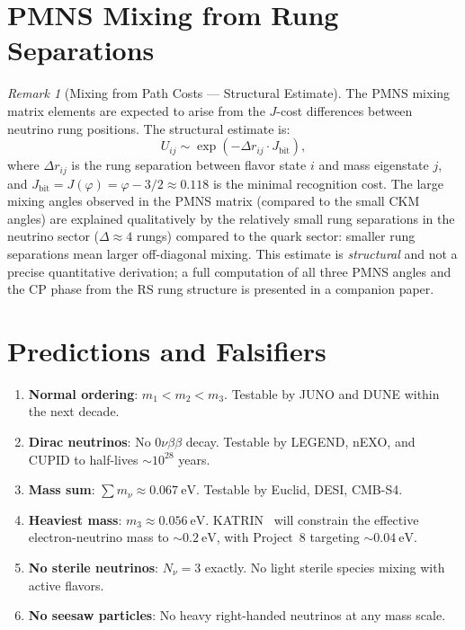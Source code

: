 \documentclass[12pt,a4paper]{article}
\theoremstyle{definition}
\theoremstyle{remark}
\newtheorem{remark}[theorem]{Remark}
\begin{document}
\section{PMNS Mixing from Rung Separations}
\label{sec:pmns}

\begin{remark}[Mixing from Path Costs --- Structural Estimate]
\label{rem:pmns}
The PMNS mixing matrix elements are expected to arise from the
$J$-cost differences between neutrino rung positions.  The
structural estimate is:
\begin{equation}
  U_{ij} \sim \exp(-\Delta r_{ij} \cdot J_{\mathrm{bit}}),
\end{equation}
where $\Delta r_{ij}$ is the rung separation between flavor
state $i$ and mass eigenstate $j$, and
$J_{\mathrm{bit}} = J(\varphi) = \varphi - 3/2 \approx
0.118$ is the minimal recognition cost.  The large mixing
angles observed in the PMNS matrix (compared to the small
CKM angles) are explained qualitatively by the relatively small
rung separations in the neutrino sector ($\Delta \approx 4$
rungs) compared to the quark sector: smaller rung separations
mean larger off-diagonal mixing.  This estimate is
\emph{structural} and not a precise quantitative derivation;
a full computation of all three PMNS angles and the CP phase
from the RS rung structure is presented in a companion paper.
\end{remark}

\section{Predictions and Falsifiers}
\label{sec:predictions}

\begin{enumerate}
  \item \textbf{Normal ordering}: $m_1 < m_2 < m_3$.
  Testable by JUNO and DUNE within the next decade.

  \item \textbf{Dirac neutrinos}: No $0\nu\beta\beta$ decay.
  Testable by LEGEND, nEXO, and CUPID to half-lives
  $\sim 10^{28}$ years.

  \item \textbf{Mass sum}: $\sum m_\nu \approx
  0.067~\mathrm{eV}$.  Testable by Euclid, DESI, CMB-S4.

  \item \textbf{Heaviest mass}: $m_3 \approx
  0.056~\mathrm{eV}$.  KATRIN~\cite{KATRIN} will constrain
  the effective electron-neutrino mass to
  $\sim 0.2~\mathrm{eV}$, with Project~8 targeting
  $\sim 0.04~\mathrm{eV}$.

  \item \textbf{No sterile neutrinos}: $N_\nu = 3$ exactly.
  No light sterile species mixing with active flavors.

  \item \textbf{No seesaw particles}: No heavy right-handed
  neutrinos at any mass scale.
\end{enumerate}
\end{document}
